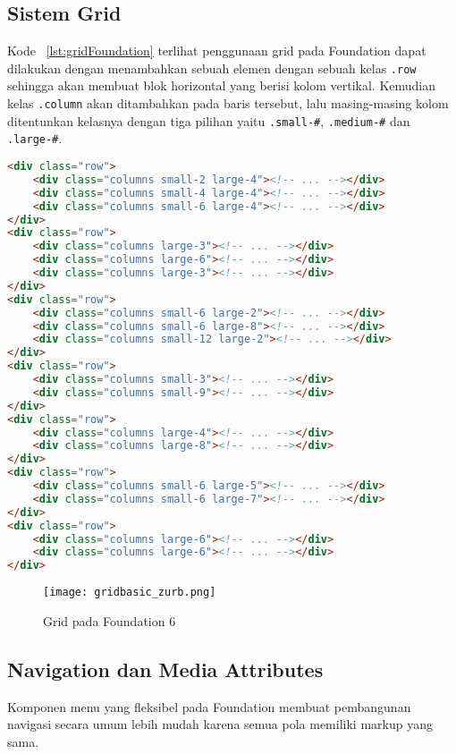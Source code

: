 \subsection{Sistem Grid}
Kode ~\ref{lst:gridFoundation} terlihat penggunaan grid pada Foundation dapat dilakukan dengan menambahkan sebuah elemen dengan sebuah kelas \texttt{.row} sehingga akan membuat blok horizontal yang berisi kolom vertikal. Kemudian kelas \texttt{.column} akan ditambahkan pada baris tersebut, lalu masing-masing kolom ditentunkan kelasnya dengan tiga pilihan yaitu 
\texttt{.small-\#}, \texttt{.medium-\#} dan \texttt{.large-\#}.

\begin{lstlisting}[style=customhtml, language=HTML,  basicstyle=\ttfamily, frame=single, columns=fullflexible, keepspaces=true, breaklines=true, showstringspaces=false, label={lst:gridFoundation}, caption=Struktur Grid Foundation 6.] 
<div class="row">
	<div class="columns small-2 large-4"><!-- ... --></div>
	<div class="columns small-4 large-4"><!-- ... --></div>
	<div class="columns small-6 large-4"><!-- ... --></div>
</div>
<div class="row">
	<div class="columns large-3"><!-- ... --></div>
	<div class="columns large-6"><!-- ... --></div>
	<div class="columns large-3"><!-- ... --></div>
</div>
<div class="row">
	<div class="columns small-6 large-2"><!-- ... --></div>
	<div class="columns small-6 large-8"><!-- ... --></div>
	<div class="columns small-12 large-2"><!-- ... --></div>
</div>
<div class="row">
	<div class="columns small-3"><!-- ... --></div>
	<div class="columns small-9"><!-- ... --></div>
</div>
<div class="row">
	<div class="columns large-4"><!-- ... --></div>
	<div class="columns large-8"><!-- ... --></div>
</div>
<div class="row">
	<div class="columns small-6 large-5"><!-- ... --></div>
	<div class="columns small-6 large-7"><!-- ... --></div>
</div>
<div class="row">
	<div class="columns large-6"><!-- ... --></div>
	<div class="columns large-6"><!-- ... --></div>
</div>
\end{lstlisting}

\begin{figure} [H]
	\centering  
	\texttt{[image: gridbasic\_zurb.png]}  
	\caption{Grid pada Foundation 6}
	\label{fig:gridFoundation}	 
\end{figure}

\subsection{Navigation dan Media Attributes}
Komponen menu yang fleksibel pada Foundation membuat pembangunan navigasi secara umum lebih mudah karena semua pola memiliki markup yang sama.

